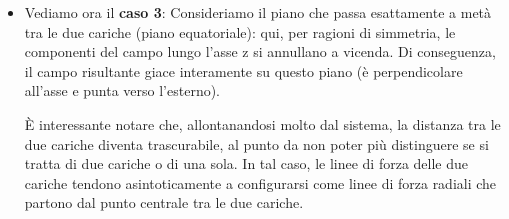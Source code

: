 \documentclass{book}
\begin{document}
\begin{itemize}
\item
Vediamo ora il \textbf{caso 3}: Consideriamo il piano che passa esattamente a metà tra le due cariche (piano equatoriale): qui, per ragioni di simmetria, le componenti del campo lungo l'asse z si annullano a vicenda. Di conseguenza, il campo risultante giace interamente su questo piano (è perpendicolare all'asse e punta verso l'esterno).   

È interessante notare che, allontanandosi molto dal sistema, la distanza tra le due cariche diventa trascurabile, al punto da non poter più distinguere se si tratta di due cariche o di una sola.  
In tal caso, le linee di forza delle due cariche tendono asintoticamente a configurarsi come linee di forza radiali che partono dal punto centrale tra le due cariche.  

\end{itemize}
\end{document}
